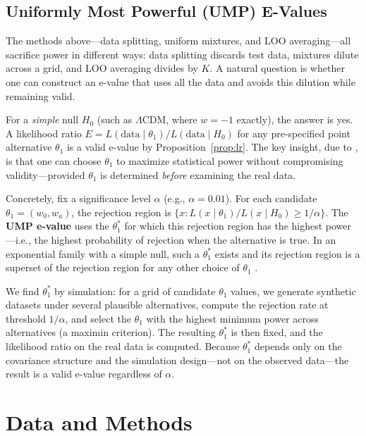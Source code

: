 \documentclass[11pt,a4paper]{article}
\newcommand{\LCDM}{$\Lambda$CDM}
\begin{document}
\subsection{Uniformly Most Powerful (UMP) E-Values}
\label{sec:ump_theory}

The methods above---data splitting, uniform mixtures, and LOO averaging---all sacrifice power in different ways: data splitting discards test data, mixtures dilute across a grid, and LOO averaging divides by $K$. A natural question is whether one can construct an e-value that uses all the data and avoids this dilution while remaining valid.

For a \textit{simple} null $H_0$ (such as \LCDM, where $w = -1$ exactly), the answer is yes. A likelihood ratio $E = L(\text{data} \mid \theta_1) / L(\text{data} \mid H_0)$ for any pre-specified point alternative $\theta_1$ is a valid e-value by Proposition~\ref{prop:lr}. The key insight, due to \citet{GrunwaldSafeTesting2024}, is that one can choose $\theta_1$ to maximize statistical power without compromising validity---provided $\theta_1$ is determined \textit{before} examining the real data.

Concretely, fix a significance level $\alpha$ (e.g., $\alpha = 0.01$). For each candidate $\theta_1 = (w_0, w_a)$, the rejection region is $\{x : L(x \mid \theta_1)/L(x \mid H_0) \geq 1/\alpha\}$. The \textbf{UMP e-value} uses the $\theta_1^*$ for which this rejection region has the highest power---i.e., the highest probability of rejection when the alternative is true. In an exponential family with a simple null, such a $\theta_1^*$ exists and its rejection region is a superset of the rejection region for any other choice of $\theta_1$ \citep{GrunwaldSafeTesting2024}.

We find $\theta_1^*$ by simulation: for a grid of candidate $\theta_1$ values, we generate synthetic datasets under several plausible alternatives, compute the rejection rate at threshold $1/\alpha$, and select the $\theta_1$ with the highest minimum power across alternatives (a maximin criterion). The resulting $\theta_1^*$ is then fixed, and the likelihood ratio on the real data is computed. Because $\theta_1^*$ depends only on the covariance structure and the simulation design---not on the observed data---the result is a valid e-value regardless of $\alpha$.

\section{Data and Methods}
\label{sec:methods}
\end{document}
